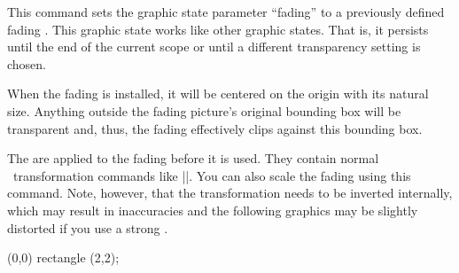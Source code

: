 \begin{command}{\pgfsetfading{}}
    This command sets the graphic state parameter ``fading'' to a previously
    defined fading . This graphic state works like other graphic
    states. That is, it persists until the end of the current scope or until a
    different transparency setting is chosen.

    When the fading is installed, it will be centered on the origin with its
    natural size. Anything outside the fading picture's original bounding box
    will be transparent and, thus, the fading effectively clips against this
    bounding box.

    The  are applied to the fading before it is used.
    They contain normal \pgfname\ transformation commands like
    |\pgftransformshift|. You can also scale the fading using this command.
    Note, however, that the transformation needs to be inverted internally,
    which may result in inaccuracies and the following graphics may be slightly
    distorted if you use a strong .
\begin{codeexample}[]
{\tikz \shade[left color=pgftransparent!0,
              right color=pgftransparent!100] (0,0) rectangle (2,2);}
\end{codeexample}
\begin{codeexample}[preamble={\pgfdeclarefading{fading2}
{\tikz \shade[left color=pgftransparent!0,
              right color=pgftransparent!100] (0,0) rectangle (2,2);}}]
\end{codeexample}
\end{command}

